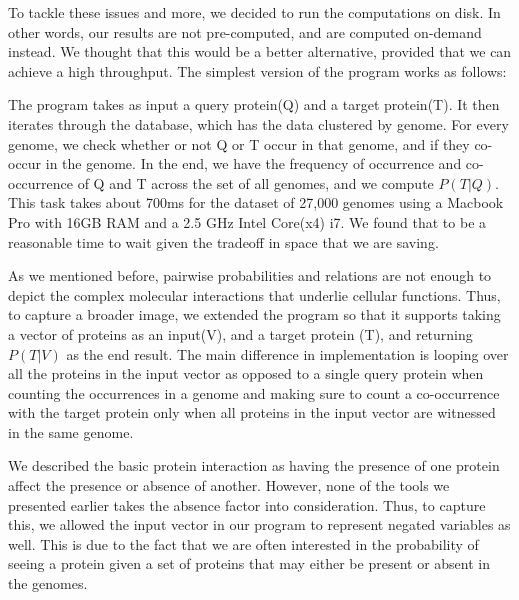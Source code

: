 \documentclass{ucetd}
\begin{document}
To tackle these issues and more, we decided to run the computations on disk. In other words, our results are not pre-computed, and are computed on-demand instead. We thought that this would be a better alternative, provided that we can achieve a high throughput. The simplest version of the program works as follows: 

The program takes as input a query protein(Q) and a target protein(T). It then iterates through the database, which has the data clustered by genome. For every genome, we check whether or not Q or T occur in that genome, and if they co-occur in the genome. In the end, we have the frequency of occurrence and co-occurrence of Q and T across the set of all genomes, and we compute $P(T|Q)$. This task takes about 700ms for the dataset of 27,000 genomes using a Macbook Pro with 16GB RAM and a 2.5 GHz Intel Core(x4) i7. We found that to be a reasonable time to wait given the tradeoff in space that we are saving. 

As we mentioned before, pairwise probabilities and relations are not enough to depict the complex molecular interactions that underlie cellular functions. Thus, to capture a broader image, we extended the program so that it supports taking a vector of proteins as an input(V), and a target protein (T), and returning $P(T|V)$ as the end result. The main difference in implementation is looping over all the proteins in the input vector as opposed to a single query protein when counting the occurrences in a genome and making sure to count a co-occurrence with the target protein only when all proteins in the input vector are witnessed in the same genome. 

We described the basic protein interaction as having the presence of one protein affect the presence or absence of another. However, none of the tools we presented earlier takes the absence factor into consideration. Thus, to capture this, we allowed the input vector in our program to represent negated variables as well. This is due to the fact that we are often interested in the probability of seeing a protein given a set of proteins that may either be present or absent in the genomes.
\end{document}
